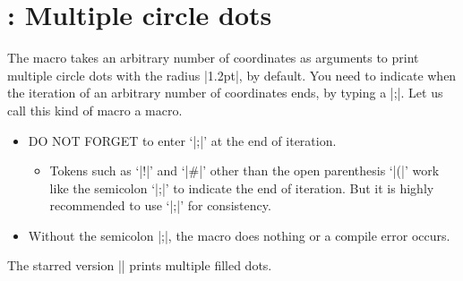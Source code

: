 \begin{tzcode}{.3}
\end{tzcode}

\begin{tzcode}{.3}
\end{tzcode}


\section{\protect\cmd{\tzcdots(*)}: Multiple circle dots}
\label{s:tzcdots}

The macro \icmd{\tzcdots} takes an arbitrary number of coordinates as arguments to print multiple circle dots with the radius |1.2pt|, by default.
You need to indicate when the iteration of an arbitrary number of coordinates ends, by typing a  |;|.
Let us call this kind of macro a  macro.

\remark
\begin{itemize}
\item DO NOT FORGET to enter `|;|' at the end of iteration.
  \begin{itemize}
  \item Tokens such as `|!|' and `|#|' other than the open parenthesis `|(|' work like the semicolon `|;|' to indicate the end of iteration.
        But it is highly recommended to use `|;|' for consistency.
  \end{itemize}
\item Without the semicolon |;|, the macro does nothing or a compile error occurs.
\end{itemize}


The starred version |\tzcdots*| prints multiple filled dots.

